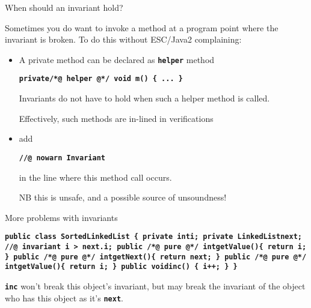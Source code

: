 \documentclass[
pdf,
nocolorBG,
slideColor,
erik,
]{prosper}
\newcommand{\code}[1]{{\rm \texttt{\textbf{\small #1}}}}
\begin{document}
\begin{slide}{When should an invariant hold?}
\vspace*{-4ex}

Sometimes you do want to invoke a method at a program point
where the invariant is broken.
To do this without ESC/Java2 complaining:

\begin{itemize}
\item
A private method can be declared as \code{helper} method
\begin{alltt}\code{\scriptsize private{\red /*@ helper @*/} void m() \{ ... \}}
\end{alltt}
Invariants do not have to hold when such a helper method is called.

\medskip

Effectively, such methods are in-lined in verifications

\item
add 
\begin{alltt}\code{\scriptsize{\red //@ nowarn Invariant}}
\end{alltt}
in the line where this method call occurs.

\smallskip

NB this is unsafe, and a possible source of unsoundness!

\end{itemize}

\end{slide}




\begin{slide}{More problems with invariants}
\vspace*{-4ex}


\begin{alltt}\code{\scriptsize public class SortedLinkedList \{
   private int{\green i};
   private LinkedList{\green next};
   //@ invariant i > next.i;
   public /*@ pure @*/ int{\green getValue}()\{ return i; \}
   public /*@ pure @*/ int{\green getNext}()\{ return next; \}
   public /*@ pure @*/ int{\green getValue}()\{ return i; \}
   public void{\green inc}() \{ i++; \}
  \}}
\end{alltt}

\code{inc} won't break this object's invariant, but may break the invariant
of the object who has this object as it's \code{next}.

\end{slide}
\end{document}
